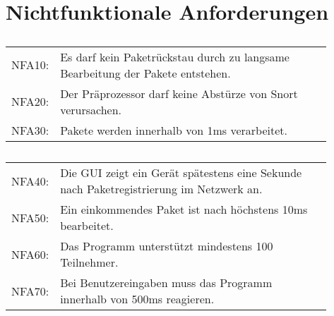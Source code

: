 \chapter{Nichtfunktionale Anforderungen}

\section{\sppname}
\begin{tabular}{lp{0.9\linewidth}}
NFA10: & Es darf kein Paketrückstau durch zu langsame Bearbeitung der Pakete entstehen. \\

NFA20: & Der Präprozessor darf keine Abstürze von Snort verursachen. \\

NFA30: & Pakete werden innerhalb von 1ms verarbeitet.
\end{tabular}
\section{\programname}
\begin{tabular}{lp{0.9\linewidth}}
NFA40: & Die GUI zeigt ein Gerät spätestens eine Sekunde nach Paketregistrierung im Netzwerk an. \\

NFA50: & Ein einkommendes Paket ist nach höchstens 10ms bearbeitet. \\

NFA60: & Das Programm unterstützt mindestens 100 Teilnehmer. \\

NFA70: & Bei Benutzereingaben muss das Programm innerhalb von 500ms reagieren. \\
\end{tabular} 